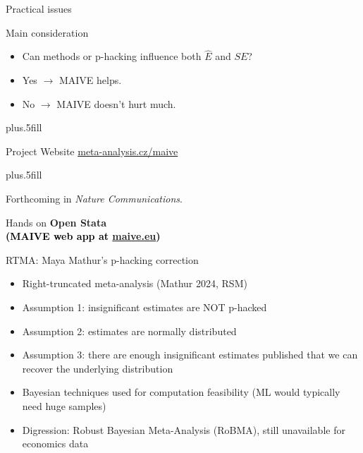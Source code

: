 \documentclass{beamer} %
\begin{document}
\begin{frame}{Practical issues}
  \begin{block}{Main consideration}
  \begin{itemize}
  \item Can methods or p-hacking influence both $\hat{E}$ and $SE$? %
	
	\item Yes $\rightarrow$ MAIVE helps. %
	
	\item No $\rightarrow$ MAIVE doesn't hurt much. %


  \end{itemize}
  \end{block}

\vskip0pt plus.5fill
    \begin{block}{Project Website}
      \href{http://www.meta-analysis.cz/maive}{meta-analysis.cz/maive}
    \end{block}
		
		\vskip0pt plus.5fill
		
		Forthcoming in \emph{Nature Communications}.
		
\end{frame}



\begin{frame}{Hands on}
  \centering
  \vfill
  {\bfseries\LARGE Open Stata \\[0.5em]
   \textcolor{black}{\normalsize (MAIVE web app at \href{https://maive.eu}{maive.eu})}}
  \vfill
\end{frame}






\begin{frame}{RTMA: Maya Mathur's p-hacking correction}
\begin{itemize}
	\item Right-truncated meta-analysis (Mathur 2024, RSM)
	\item Assumption 1: insignificant estimates are NOT p-hacked
	\item Assumption 2: estimates are normally distributed
	\item Assumption 3: there are enough insignificant estimates published that we can recover the underlying distribution
	\item Bayesian techniques used for computation feasibility (ML would typically need huge samples)
	\item Digression: Robust Bayesian Meta-Analysis (RoBMA), still unavailable for economics data
\end{itemize}
\end{frame}
\end{document}
